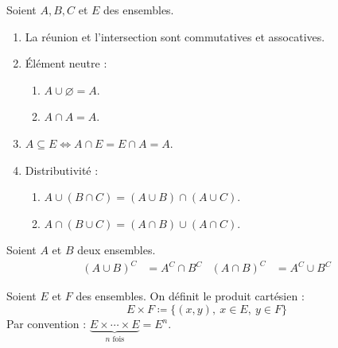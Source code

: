 \begin{proposition}
	Soient $A, B, C$ et $E$ des ensembles.
	\begin{enumerate}
		\item La réunion et l'intersection sont commutatives et assocatives.
		\item \'Elément neutre :
		\begin{enumerate}
			\item $A \cup \varnothing = A$.
			\item $A \cap A = A$.
		\end{enumerate}
		\item $A \subseteq E \iff A \cap E = E \cap A = A$.
		\item Distributivité :
		\begin{enumerate}
			\item $A \cup (B \cap C) = (A \cup B) \cap (A \cup C)$.
			\item $A \cap (B \cup C) = (A \cap B) \cup (A \cap C)$.
		\end{enumerate}
	\end{enumerate}
\end{proposition}

\begin{proposition}
  Soient $A$ et $B$ deux ensembles.
  \begin{align*}
    (A \cup B)^{C} &= A^{C} \cap B^{C} & (A \cap B)^{C} &= A^{C} \cup B^{C}
  \end{align*}
\end{proposition}

\begin{definition}
    Soient $E$ et $F$ des ensembles. On définit le produit cartésien :
    \[ E \times F \coloneqq \{ (x, y),\ x \in E,\ y \in F \} \]
    Par convention : $\underbrace{E \times \cdots \times E}_{n \text{ fois}} = E^n$.
\end{definition}
